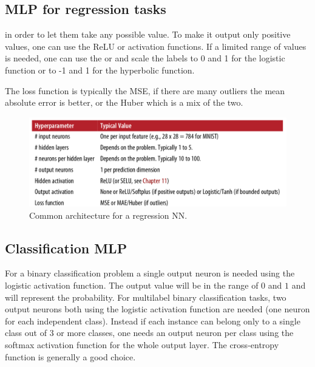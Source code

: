 

\subsection{MLP for regression tasks}
 in order to let them take any possible value. To make it output only positive values, one can use the ReLU or  activation functions. If a limited range of values is needed, one can use the  or  and scale the labels to 0 and 1 for the logistic function or to -1 and 1 for the hyperbolic function.

The loss function is typically the MSE, if there are many outliers the mean absolute error is better, or the Huber which is a mix of the two.

\begin{figure}
\includegraphics[scale=0.4]{img/NNRegArchitecture}
\caption{Common architecture for a regression NN.}
\end{figure}

\subsection{Classification MLP}
For a binary classification problem a single output neuron is needed using the logistic activation function. The output value will be in the range of $0$ and $1$ and will represent the probability. For multilabel binary classification tasks, two output neurons  both using the logistic activation function are needed (one neuron for each independent class). Instead if each instance can belong only to a single class out of 3 or more classes, one needs an output neuron per class using the softmax activation function for the whole output layer. The cross-entropy function is generally a good choice.


